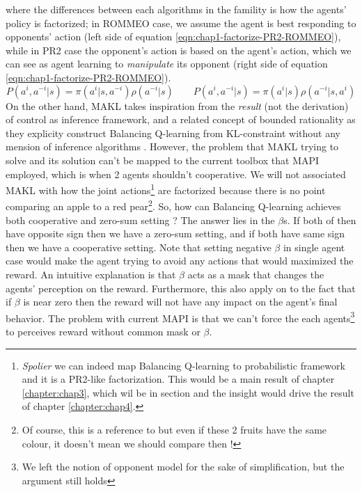 where the differences between each algorithms in the famility is how the agents' policy is factorized; in ROMMEO case, we assume the agent is best responding to opponents' action (left side of equation \ref{eqn:chap1-factorize-PR2-ROMMEO}), while in PR2 case the opponent's action is based on the agent's action, which we can see as agent learning to \textit{manipulate} its opponent (right side of equation \ref{eqn:chap1-factorize-PR2-ROMMEO}).
\begin{equation}
\label{eqn:chap1-factorize-PR2-ROMMEO}
    P(a^{i}, a^{-i} | s) = \pi(a^{i} | s, a^{-i}) \rho(a^{-i} | s) \qquad P(a^{i}, a^{-i} | s) = \pi(a^{i} | s) \rho(a^{-i} | s, a^{i})
\end{equation}
On the other hand, MAKL takes inspiration from the \textit{result} (not the derivation) of control as inference framework, and a related concept of bounded rationality as they explicity construct Balancing Q-learning from KL-constraint without any mension of inference algorithms \cite{grau2018balancing}. However, the problem that MAKL trying to solve and its solution can't be mapped to the current toolbox that MAPI employed, which is when 2 agents shouldn't cooperative. We will not associated MAKL with how the joint actions\footnote{\textit{Spolier} we can indeed map Balancing Q-learning to probabilistic framework and it is a PR2-like factorization. This would be a main result of chapter \ref{chapter:chap3}, which wil be in section  and the insight would drive the result of chapter \ref{chapter:chap4}.} are factorized because there is no point comparing an apple to a red pear\footnote{Of course, this is a reference to  but even if these 2 fruits have the same colour, it doesn't mean we should compare then !}. So, how can Balancing Q-learning achieves both cooperative and zero-sum setting ? The answer lies in the $\beta$s. If both of then have opposite sign then we have a zero-sum setting, and if both have same sign then we have a cooperative setting. Note that setting negative $\beta$ in single agent case would make the agent trying to avoid any actions that would maximized the reward. An intuitive explanation is that $\beta$ acts as a mask that changes the agents' perception on the reward. Furthermore, this also apply on to the fact that if $\beta$ is near zero then the reward will not have any impact on the agent's final behavior.  The problem with current MAPI is that we can't force the each agents\footnote{We left the notion of opponent model for the sake of simplification, but the argument still holds} to perceives reward without common mask or $\beta$. 

